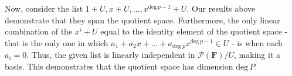 \documentclass{book}
\begin{document}
\begin{enumerate}
Now, consider the list \(1+U,x+U,\dots,x^{\text{deg} \, p-1}+U\).  Our results above demonstrate that they span the quotient space.  Furthermore, the only linear combination of the \(x^i+U\) equal to the identity element of the quotient space - that is the only one in which \(a_1+a_2x+\dots+a_{\text{deg} \ p}x^{\text{deg} \, p-1} \in U\) - is when each \(a_i=0\).  Thus, the given list is linearly independent in \(\mathcal{P}(\textbf{F})/U\), making it a basis.  This demonstrates that the quotient space has dimension \(\text{deg} \, P\).

\end{enumerate}
\end{document}
